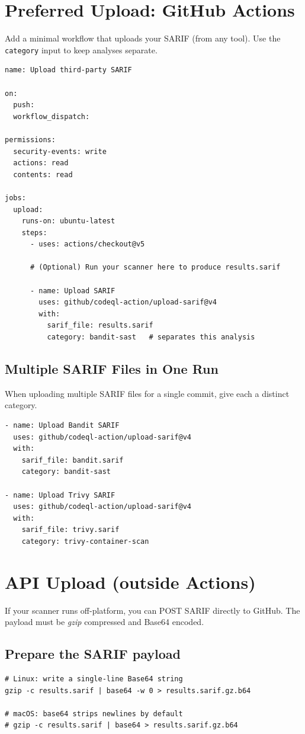 \documentclass[11pt,a4paper]{article}
\providecommand{\term}[1]{\texttt{#1}}
\begin{document}
\section{Preferred Upload: GitHub Actions}
Add a minimal workflow that uploads your SARIF (from any tool). Use the \term{category} input to keep analyses separate.
\begin{verbatim}
name: Upload third-party SARIF

on:
  push:
  workflow_dispatch:

permissions:
  security-events: write
  actions: read
  contents: read

jobs:
  upload:
    runs-on: ubuntu-latest
    steps:
      - uses: actions/checkout@v5

      # (Optional) Run your scanner here to produce results.sarif

      - name: Upload SARIF
        uses: github/codeql-action/upload-sarif@v4
        with:
          sarif_file: results.sarif
          category: bandit-sast   # separates this analysis
\end{verbatim}

\subsection{Multiple SARIF Files in One Run}
When uploading multiple SARIF files for a single commit, give each a distinct category.
\begin{verbatim}
- name: Upload Bandit SARIF
  uses: github/codeql-action/upload-sarif@v4
  with:
    sarif_file: bandit.sarif
    category: bandit-sast

- name: Upload Trivy SARIF
  uses: github/codeql-action/upload-sarif@v4
  with:
    sarif_file: trivy.sarif
    category: trivy-container-scan
\end{verbatim}
\clearpage

\section{API Upload (outside Actions)}
If your scanner runs off-platform, you can POST SARIF directly to GitHub. The payload must be \emph{gzip} compressed and Base64 encoded.

\subsection{Prepare the SARIF payload}
\begin{verbatim}
# Linux: write a single-line Base64 string
gzip -c results.sarif | base64 -w 0 > results.sarif.gz.b64

# macOS: base64 strips newlines by default
# gzip -c results.sarif | base64 > results.sarif.gz.b64
\end{verbatim}
\end{document}
